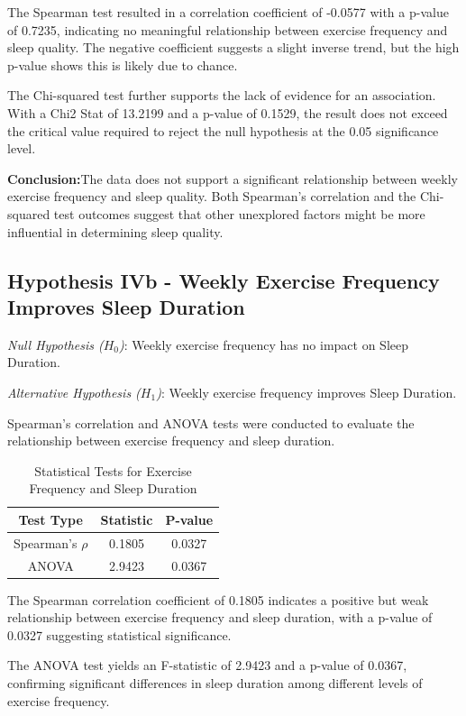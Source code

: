 \documentclass[conference]{IEEEtran}
\begin{document}
The Spearman test resulted in a correlation coefficient of -0.0577 with a p-value of 0.7235, indicating no meaningful relationship between exercise frequency and sleep quality. The negative coefficient suggests a slight inverse trend, but the high p-value shows this is likely due to chance.

The Chi-squared test further supports the lack of evidence for an association. With a Chi2 Stat of 13.2199 and a p-value of 0.1529, the result does not exceed the critical value required to reject the null hypothesis at the 0.05 significance level.

\textbf{Conclusion:}The data does not support a significant relationship between weekly exercise frequency and sleep quality. Both Spearman's correlation and the Chi-squared test outcomes suggest that other unexplored factors might be more influential in determining sleep quality.

\subsection*{Hypothesis IVb - Weekly Exercise Frequency Improves Sleep Duration}
\textit{Null Hypothesis (\(H_0\))}: Weekly exercise frequency has no impact on Sleep Duration.

\textit{Alternative Hypothesis (\(H_1\))}: Weekly exercise frequency improves Sleep Duration.

Spearman's correlation and ANOVA tests were conducted to evaluate the relationship between exercise frequency and sleep duration.

\begin{table}[ht]
\centering
\caption{Statistical Tests for Exercise Frequency and Sleep Duration}
\label{tab:hypothesis4b}
\begin{tabular}{|c|c|c|}
\hline
\textbf{Test Type} & \textbf{Statistic} & \textbf{P-value} \\
\hline
Spearman's \(\rho\) & 0.1805 & 0.0327 \\
\hline
ANOVA & 2.9423 & 0.0367 \\
\hline
\end{tabular}
\end{table}

The Spearman correlation coefficient of 0.1805 indicates a positive but weak relationship between exercise frequency and sleep duration, with a p-value of 0.0327 suggesting statistical significance.

The ANOVA test yields an F-statistic of 2.9423 and a p-value of 0.0367, confirming significant differences in sleep duration among different levels of exercise frequency.
\end{document}
